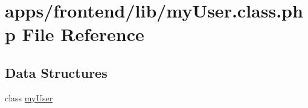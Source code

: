 \hypertarget{frontend_2lib_2my_user_8class_8php}{\section{apps/frontend/lib/my\-User.class.\-php File Reference}
\label{frontend_2lib_2my_user_8class_8php}
}
\subsection*{Data Structures}
\begin{DoxyCompactItemize}
\item 
class \hyperlink{classmy_user}{my\-User}
\end{DoxyCompactItemize}
